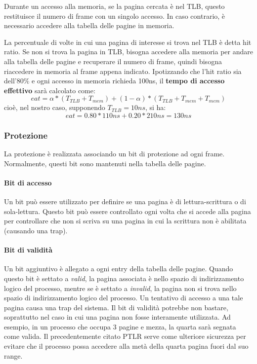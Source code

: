 \documentclass[a4]{article}
\begin{document}
Durante un accesso alla memoria, se la pagina cercata è nel TLB, questo restituisce il numero di frame con un singolo accesso. In caso contrario, è necessario accedere alla tabella delle pagine in memoria.

La percentuale di volte in cui una pagina di interesse si trova nel TLB è detta hit ratio. Se non si trova la pagina in TLB, bisogna accedere alla memoria per andare alla tabella delle pagine e recuperare il numero di frame, quindi bisogna riaccedere in memoria al frame appena indicato. Ipotizzando che l'hit ratio sia dell'80\% e ogni accesso in memoria richieda 100ns, il \textbf{tempo di accesso effettivo} sarà calcolato come:
$$ eat = \alpha * (T_{TLB}+T_{mem}) + (1-\alpha) * (T_{TLB}+T_{mem} + T_{mem}) $$
cioè, nel nostro caso, supponendo $T_{TLB} = 10ns$, si ha:
$$ eat = 0.80 * 110ns + 0.20 * 210ns = 130ns $$

\subsubsection{Protezione}
La protezione è realizzata associando un bit di protezione ad ogni frame. Normalmente, questi bit sono mantenuti nella tabella delle pagine.
\paragraph{Bit di accesso} Un bit può essere utilizzato per definire se una pagina è di lettura-scrittura o di sola-lettura. Questo bit può essere controllato ogni volta che si accede alla pagina per controllare che non si scriva su una pagina in cui la scrittura non è abilitata (causando una trap).
\paragraph{Bit di validità} Un bit aggiuntivo è allegato a ogni entry della tabella delle pagine. Quando questo bit è settato a \textit{valid}, la pagina associata è nello spazio di indirizzamento logico del processo, mentre se è settato a \textit{invalid}, la pagina non si trova nello spazio di indirizzamento logico del processo. Un tentativo di accesso a una tale pagina causa una trap del sistema. Il bit di validità potrebbe non bastare, soprattutto nel caso in cui una pagina non fosse interamente utilizzata. Ad esempio, in un processo che occupa 3 pagine e mezza, la quarta sarà segnata come valida. Il precedentemente citato PTLR serve come ulteriore sicurezza per evitare che il processo possa accedere alla metà della quarta pagina fuori dal suo range.
\end{document}

